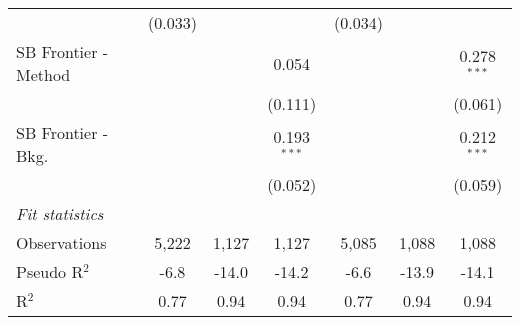 \begin{tabular}{lcccccc}
                                & (0.033)        &               &               & (0.034)        &               &   \\   
   SB Frontier - Method         &                &               & 0.054         &                &               & 0.278$^{***}$\\   
                                &                &               & (0.111)       &                &               & (0.061)\\   
   SB Frontier - Bkg.           &                &               & 0.193$^{***}$ &                &               & 0.212$^{***}$\\   
                                &                &               & (0.052)       &                &               & (0.059)\\   
   \midrule
   \emph{Fit statistics}\\
   Observations                 & 5,222          & 1,127         & 1,127         & 5,085          & 1,088         & 1,088\\  
   Pseudo R$^2$                 & -6.8           & -14.0         & -14.2         & -6.6           & -13.9         & -14.1\\  
   R$^2$                        & 0.77           & 0.94          & 0.94          & 0.77           & 0.94          & 0.94\\  
   

\end{tabular}
